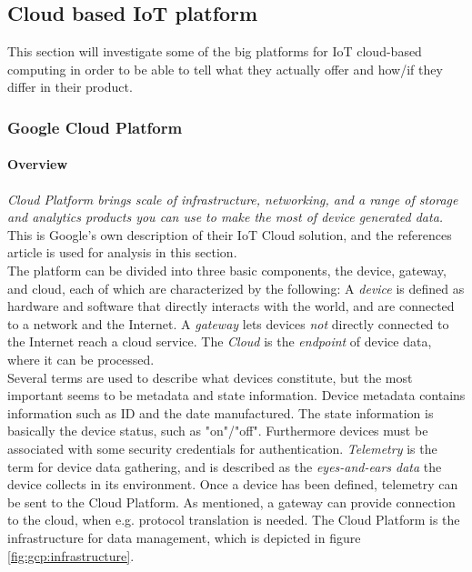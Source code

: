\cite{books:big-data}

\subsection{Cloud based IoT platform}
\label{iot_platforms}
This section will investigate some of the big platforms for IoT cloud-based computing in order to be able to tell what they actually offer and how/if they differ in their product. 

\subsubsection{Google Cloud Platform}
\paragraph{Overview} 
\textit{Cloud Platform brings scale of infrastructure, networking, and a range of storage and analytics products you can use to make the most of device generated data.}\cite{website:gcp}
This is Google's own description of their IoT Cloud solution, and the references article is used for analysis in this section. \\

The platform can be divided into three basic components, the device, gateway, and cloud, each of which are characterized by the following: A \textit{device} is defined as hardware and software that directly interacts with the world, and are connected to a network and the Internet. A \textit{gateway} lets devices \textit{not} directly connected to the Internet reach a cloud service. The \textit{Cloud} is the \textit{endpoint} of device data, where it can be processed.\\

Several terms are used to describe what devices constitute, but the most important seems to be metadata and state information. Device metadata contains information such as ID and the date manufactured. The state information is basically the device status, such as "on"/"off". Furthermore devices must be associated with some security credentials for authentication. \textit{Telemetry} is the term for device data gathering, and is described as the \textit{eyes-and-ears data} the device collects in its environment. Once a device has been defined, telemetry can be sent to the Cloud Platform. As mentioned, a gateway can provide connection to the cloud, when e.g. protocol translation is needed. The Cloud Platform is the infrastructure for data management, which is depicted in figure \ref{fig:gcp:infrastructure}.

